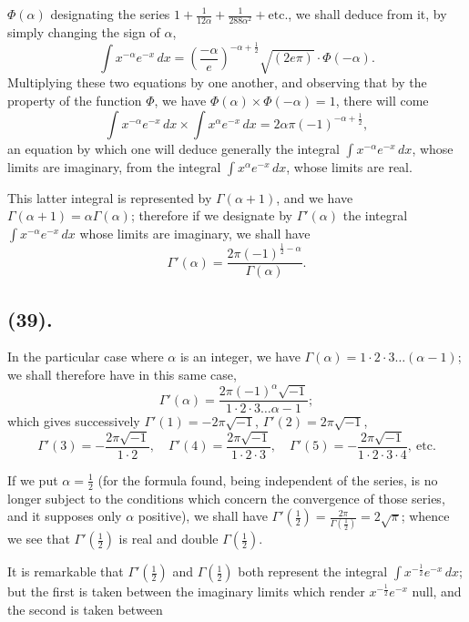 \documentclass{article}
\begin{document}
$\Phi(\alpha)$ designating the series $1+\frac{1}{12\alpha}+\frac{1}{288\alpha^{2}}+\text{etc.}$, we shall deduce from it, by simply changing the sign of $\alpha$,
\[ \int x^{-\alpha}e^{-x}\,dx=\left(\frac{-\alpha}{e}\right)^{-\alpha+\frac{1}{2}}\sqrt{(2e\pi)}\cdot\Phi(-\alpha). \]
Multiplying these two equations by one another, and observing that by the property of the function $\Phi$, we have $\Phi(\alpha)\times\Phi(-\alpha)=1$, there will come
\[ \int x^{-\alpha}e^{-x}\,dx\times\int x^{\alpha}e^{-x}\,dx=2\alpha\pi(-1)^{-\alpha+\frac{1}{2}}, \]
an equation by which one will deduce generally the integral $\displaystyle\int x^{-\alpha}e^{-x}\,dx$, whose limits are imaginary, from the integral $\displaystyle\int x^{\alpha}e^{-x}\,dx$, whose limits are real.

This latter integral is represented by $\Gamma(\alpha+1)$, and we have $\Gamma(\alpha+1)=\alpha\Gamma(\alpha)$; therefore if we designate by $\Gamma'(\alpha)$ the integral $\displaystyle\int x^{-\alpha}e^{-x}\,dx$ whose limits are imaginary, we shall have
\[ \Gamma'(\alpha)=\frac{2\pi(-1)^{\frac{1}{2}-\alpha}}{\Gamma(\alpha)}. \tag{1} \]

\subsection*{(39).}

In the particular case where $\alpha$ is an integer, we have $\Gamma(\alpha)=1\cdot2\cdot3\ldots(\alpha-1)$; we shall therefore have in this same case,
\[ \Gamma'(\alpha)=\frac{2\pi(-1)^{\alpha}\sqrt{-1}}{1\cdot2\cdot3\ldots\alpha-1}; \]
which gives successively $\Gamma'(1)=-2\pi\sqrt{-1}$, $\Gamma'(2)=2\pi\sqrt{-1}$,
\[ \Gamma'(3)=-\frac{2\pi\sqrt{-1}}{1\cdot2},\quad\Gamma'(4)=\frac{2\pi\sqrt{-1}}{1\cdot2\cdot3},\quad\Gamma'(5)=-\frac{2\pi\sqrt{-1}}{1\cdot2\cdot3\cdot4},\ \text{etc.} \]

If we put $\alpha=\frac{1}{2}$ (for the formula found, being independent of the series, is no longer subject to the conditions which concern the convergence of those series, and it supposes only $\alpha$ positive), we shall have $\Gamma'\left(\frac{1}{2}\right)=\frac{2\pi}{\Gamma\left(\frac{1}{2}\right)}=2\sqrt{\pi}$; whence we see that $\Gamma'\left(\frac{1}{2}\right)$ is real and double $\Gamma\left(\frac{1}{2}\right)$.

It is remarkable that $\Gamma'\left(\frac{1}{2}\right)$ and $\Gamma\left(\frac{1}{2}\right)$ both represent the integral $\displaystyle\int x^{-\frac{1}{2}}e^{-x}\,dx$; but the first is taken between the imaginary limits which render $x^{-\frac{1}{2}}e^{-x}$ null, and the second is taken between
\end{document}
